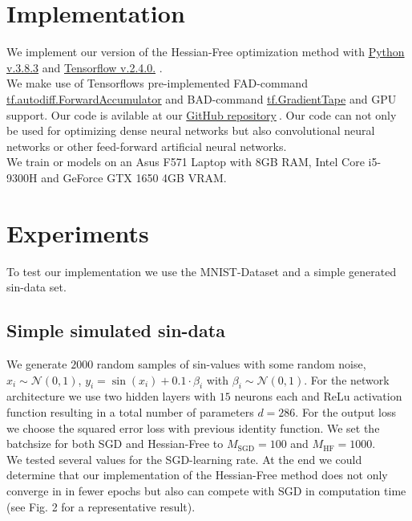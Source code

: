 \documentclass[conference]{IEEEtran}
\begin{document}
\section {Implementation}
\noindent
We implement our version of the Hessian-Free optimization method with \href{https://www.python.org/}{Python v.3.8.3} and \href{https://www.tensorflow.org/}{Tensorflow v.2.4.0.} .
\\We make use of Tensorflows pre-implemented FAD-command \href{https://www.tensorflow.org/api_docs/python/tf/autodiff/ForwardAccumulator}{tf.autodiff.ForwardAccumulator} and BAD-command \href{https://www.tensorflow.org/api_docs/python/tf/GradientTape}{tf.GradientTape} and GPU support. Our code is avilable at our \href{https://github.com/NiklasBrunn/Hessian_Free_Optimization_of_Deep_Neural_Networks}{GitHub repository}$\:$. Our code can not only be used for optimizing dense neural networks but also convolutional neural networks or other feed-forward artificial neural networks.
\\We train or models on an Asus F571 Laptop with 8GB RAM, Intel Core i5-9300H and GeForce GTX 1650 4GB VRAM.


\section{Experiments}
\noindent
To test our implementation we use the MNIST-Dataset and a simple generated sin-data set.

\subsection{Simple simulated sin-data}
\noindent
We generate $2000$ random samples of sin-values with some random noise, $x_{i}\sim\mathcal{N}(0, 1)$, $y_{i}=\sin(x_{i})+0.1\cdot\beta_{i}$ with  $\beta_{i}\sim\mathcal{N}(0,1)$. For the network architecture we use two hidden layers with $15$ neurons each and ReLu activation function resulting in a total number of parameters $d=286$. For the output loss we choose the squared error loss with previous identity function. We set the batchsize for both SGD and Hessian-Free to $M_{\mathrm{SGD}}=100$ and $M_{\mathrm{HF}}=1000$.\\
We tested several values for the SGD-learning rate. At the end we could determine that our implementation of the Hessian-Free method does not only converge in in fewer epochs but also can compete with SGD in computation time (see Fig. 2 for a representative result).
\end{document}
